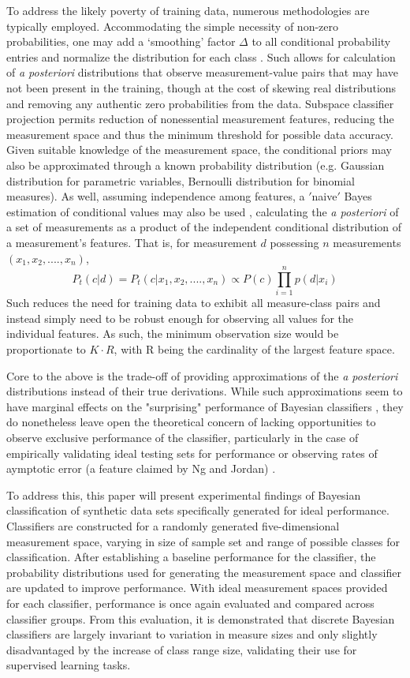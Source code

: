 \documentclass[10pt, conference]{IEEEtran}
\begin{document}
To address the likely poverty of training data, numerous methodologies are typically employed. Accommodating the simple necessity of non-zero probabilities,  one may add a ‘smoothing’ factor $\Delta$ to all conditional probability entries and normalize the distribution for each class \cite{b4}. Such allows for calculation of \textit{a posteriori} distributions that observe measurement-value pairs that may have not been present in the training, though at the cost of skewing real distributions and removing any authentic zero probabilities from the data. Subspace classifier projection permits reduction of nonessential measurement features, reducing the measurement space and thus the minimum threshold for possible data accuracy. Given suitable knowledge of the measurement space, the conditional priors may also be approximated through a known probability distribution (e.g. Gaussian distribution for parametric variables, Bernoulli distribution for binomial measures). As well, assuming independence among features, a $'$naive$'$ Bayes estimation of conditional values may also be used \cite{b1} \cite{b2}, calculating the \textit{a posteriori} of a set of measurements as a product of the independent conditional distribution of a measurement's features. That is, for measurement $d$ possessing $n$ measurements $(x_1,x_2,....,x_n)$,
\begin{equation}
P_t(c|d) = P_t(c|x_1,x_2,....,x_n) \propto P(c)\prod_{i=1}^n p(d|x_i)
\end{equation}
 Such reduces the need for training data to exhibit all measure-class pairs and instead simply need to be robust enough for observing all values for the individual features. As such, the minimum observation size would be proportionate to $K \cdot R$, with R being the cardinality of the largest feature space. 

Core to the above is the trade-off of providing approximations of the \textit{a posteriori} distributions instead of their true derivations. While such approximations seem to have marginal effects on the "surprising" performance  of Bayesian classifiers \cite{b1}, they do nonetheless leave open the theoretical concern of lacking opportunities to observe exclusive performance of the classifier, particularly in the case of empirically validating ideal testing sets for performance or observing rates of aymptotic error (a feature claimed by Ng and Jordan) \cite{b3}. 

To address this, this paper will present experimental findings of Bayesian classification of synthetic data sets specifically generated for ideal performance. Classifiers are constructed for a randomly generated five-dimensional measurement space, varying in size of sample set and range of possible classes for classification. After establishing a baseline performance for the classifier, the probability distributions used for generating the measurement space and classifier are updated to improve performance. With ideal measurement spaces provided for each classifier, performance is once again evaluated and compared across classifier groups. From this evaluation, it is demonstrated that discrete Bayesian classifiers are largely invariant to variation in measure sizes and only slightly disadvantaged by the increase of class range size, validating their use for supervised learning tasks.
\end{document}
